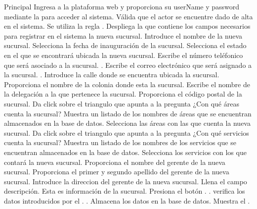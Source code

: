 	\begin{UCtrayectoria}{Principal}
		\UCpaso[\UCactor] Ingresa a la plataforma web y proporciona su userName y password mediante la \label{CU11Login} para acceder al sistema.
		\UCpaso Válida que el actor se encuentre dado de alta en el sistema. Se utiliza la regla  .
		\UCpaso Despliega la  que contiene los campos necesarios para registrar en el sistema la nueva sucursal.
		\UCpaso[\UCactor] Introduce el nombre de la nueva sucursal.
		\UCpaso[\UCactor] Selecciona la fecha de inauguración de la sucursal.
		\UCpaso[\UCactor] Selecciona el estado en el que se encontrará ubicada la nueva sucursal.
		\UCpaso[\UCactor] Escribe el número teléfonico que será asociado a la sucursal. \label{CU11AgregarTelefono}.
		\UCpaso[\UCactor] Escribe el correo electrónico que será asignado a la sucursal. \label{CU11AgregarMail}.
		\UCpaso[\UCactor] Introduce la calle donde se encuentra ubicada la sucursal.
		\UCpaso[\UCactor] Proporciona el nombre de la colonia donde esta la sucursal.
		\UCpaso[\UCactor] Escribe el nombre de la delegación a la que pertenece la sucursal.
		\UCpaso[\UCactor] Proporciona el código postal de la sucursal.
		\UCpaso[\UCactor] Da click sobre el triangulo que apunta a la pregunta ¿Con qué áreas cuenta la sucursal?
		\UCpaso	Muestra un listado de los nombres de áreas que se encuentran almacenados en la base de datos.
		\UCpaso[\UCactor] Selecciona las áreas con las que cuenta la nueva sucursal.
		\UCpaso[\UCactor] Da click sobre el triangulo que apunta a la pregunta ¿Con qué servicios cuenta la sucursal?
		\UCpaso	Muestra un listado de los nombres de los servicios que se encuentran almacenados en la base de datos.
		\UCpaso[\UCactor] Selecciona los servicios con los que contará la nueva sucursal.		
		\UCpaso[\UCactor] Proporciona el nombre del gerente de la nueva sucursal.
		\UCpaso[\UCactor] Proporciona el primer y segundo apellido del gerente de la nueva sucursal.
		\UCpaso[\UCactor] Introduce la direccion del gerente de la nueva sucursal.
		\UCpaso[\UCactor] Llena el campo descripción. Esta es información de la sucursal.
		\UCpaso[\UCactor] Presiona el botón . \label{CU11EnviarFormulario}.
		\UCpaso verifica los datos introducidos por el \UCactor.  .
		\UCpaso Almacena los datos en la base de datos.
		\UCpaso Muestra el . 
	\end{UCtrayectoria}
		
